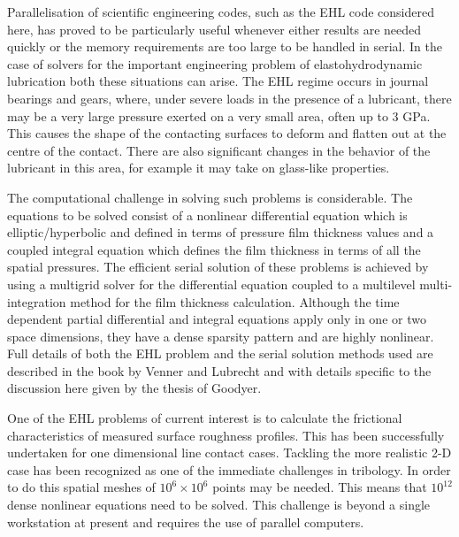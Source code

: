 \documentclass[twosided]{report}
\begin{document}
Parallelisation of scientific engineering codes, such as the EHL code
considered here, has proved to be particularly useful whenever either
results are needed quickly or the memory requirements are too large to
be handled in serial. In the case of solvers for the important
engineering problem of elastohydrodynamic lubrication both these
situations can arise. The EHL regime occurs in journal bearings and
gears, where, under severe loads in the presence of a lubricant, there
may be a very large pressure exerted on a very small area, often up to
3 GPa.  This causes the shape of the contacting surfaces to deform and
flatten out at the centre of the contact.  There are also significant
changes in the behavior of the lubricant in this area, for example it
may take on glass-like properties.

The computational challenge in solving such problems is considerable.
The equations to be solved consist of a nonlinear differential equation
which is elliptic/hyperbolic and defined in terms of pressure film
thickness values and a coupled integral equation which defines the film
thickness in terms of all the spatial pressures.  The efficient serial
solution of these problems is achieved by using a multigrid solver for
the differential equation coupled to a multilevel multi-integration
method for the film thickness calculation. Although the time dependent
partial differential and integral equations apply only in one or two
space dimensions, they have a dense sparsity pattern and are highly
nonlinear.  Full details of both the EHL problem and the serial
solution methods used are described in the book by Venner and Lubrecht
and with details specific to the discussion here given by the thesis of
Goodyer.

One  of the EHL problems of current interest is to calculate the
frictional characteristics of measured surface roughness profiles.
This has been successfully undertaken for one dimensional line contact
cases.  Tackling the more realistic 2-D case has been recognized as one
of the immediate challenges in tribology. In order to do this spatial
meshes of $10^6 \times 10^6$ points may be needed. This means that
$10^{12}$ dense nonlinear equations need to be solved. This challenge
is beyond a single workstation at present and requires the use of
parallel computers.
\end{document}
